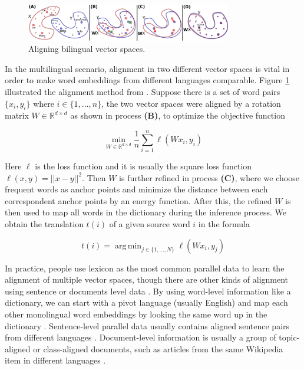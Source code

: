 \documentclass[thesis,fonts=libertine]{cluu}
\DeclareMathOperator*{\argmin}{arg\,min}
\begin{document}
\begin{figure}
  \centering
  \includegraphics[width=0.8\textwidth]{vector_spaces_alignment.png}
  \caption{Aligning bilingual vector spaces. \parencite{Conneau:2017aa}}
  \label{fig:vec_space_align}
\end{figure}

In the multilingual scenario, alignment in two different vector spaces is vital in order to make word embeddings from different languages comparable. Figure \ref{fig:vec_space_align} illustrated the alignment method from \textcite{Conneau:2017aa}. Suppose there is a set of word pairs $\{x_i, y_i\}$ where ${i\in \{1, ..., n\}}$, the two vector spaces were aligned by a rotation matrix $W \in \mathbb{R}^{d \times d}$ as shown in process \textbf{(B)}, to optimize the objective function 

\begin{equation*}
  \min_{W \in \mathbb{R}^{d \times d}} \frac{1}{n}\sum_{i=1}^n \ell(Wx_i, y_i)
\end{equation*}

\noindent Here $\ell$ is the loss function and it is usually the square loss function $\ell(x, y)=||x-y||^2$. Then $W$ is further refined in process \textbf{(C)}, where we choose frequent words as anchor points and minimize the distance between each correspondent anchor points by an energy function. After this, the refined $W$ is then used to map all words in the dictionary during the inference process. We obtain the translation $t(i)$ of a given source word $i$ in the formula

\begin{equation*}
  t(i) = \argmin_{j\in \{1, ..., N\}} \ell(Wx_i, y_j)
\end{equation*}

In practice, people use lexicon as the most common parallel data to learn the alignment of multiple vector spaces, though there are other kinds of alignment using sentence or documents level data \parencite{Ruder:2019aa}. By using word-level information like a dictionary, we can start with a pivot language (usually English) and map each other monolingual word embeddings by looking the same word up in the dictionary \parencite{Mikolov:2013ac}. Sentence-level parallel data usually contains aligned sentence pairs from different languages \parencite{Hermann:2013aa}. Document-level information is usually a group of topic-aligned or class-aligned documents, such as articles from the same Wikipedia item in different languages \parencite{vulic-moens-2013-study}.
\end{document}
